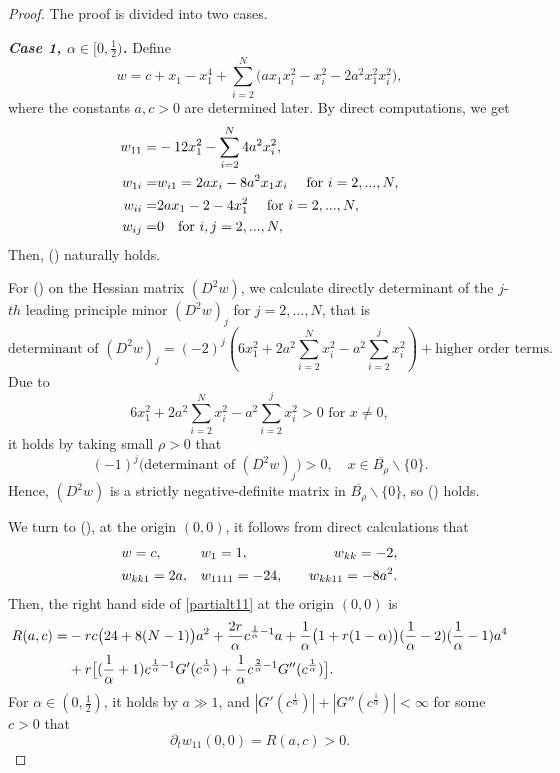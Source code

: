 \documentclass[10pt]{article}         %
\numberwithin{equation}{section}
\begin{document}
\begin{proof}
The proof is divided into two cases. 

\noindent\textbf{\emph{Case 1, $\alpha\in[0,\frac{1}{2})$.}} Define 
\begin{equation}\label{w}w=c+x_1-x_1^4+\sum\limits_{i=2}^{N}(ax_1x_i^2-x_i^2-2a^2x_1^2x_i^2\big),\end{equation}
where the constants $a,c>0$ are determined later. By direct computations, we get 
\begin{align}
 w_{11}=&-12x_1^2-\sum\limits_{i=2}^{N}4a^2x_i^2,\notag\\
 w_{1i}=&w_{i1}=2ax_i-8a^2x_1x_i\quad \text{ for }i=2,...,N,\notag\\
 w_{ii}=&2a x_1-2-4x_1^2\quad \text{ for }i=2,...,N,\notag\\
 w_{ij}=&0\quad \text{for }i,j=2,...,N,\notag
\end{align}
Then, (\expandafter{}) naturally holds.

\vspace{2mm}

For (\expandafter{}) on the Hessian matrix $(D^2w)$, we calculate directly determinant of the $j$-$th$ leading principle minor $(D^2w)_j$ for $j=2,...,N$, that is   
\[\text{determinant of } (D^2w)_j=(-2)^{j}(6x_1^2+2a^2\sum\limits_{i=2}^Nx_i^2-a^2\sum\limits_{i=2}^{j}x_i^2)+\text{higher order terms}.\]
Due to
\[6x_1^2+2a^2\sum\limits_{i=2}^Nx_i^2-a^2\sum\limits_{i=2}^{j}x_i^2>0 \text{ for }x\neq0, \]
it holds by taking small $\rho>0$ that 
\[(-1)^j\big(\text{determinant of } (D^2w)_j\big)>0,\quad x\in \overline{B_{\rho}}\backslash\{0\}.\]
Hence, $(D^2w)$ is a strictly negative-definite matrix in $\overline{B_{\rho}}\backslash\{0\}$, so (\expandafter{}) holds.


\vspace{2mm}

We turn to (\expandafter{}), at the origin $(0,0)$, it follows from direct calculations that  
\begin{align}
&w=c,         &&w_{1}=1,         &&&w_{kk}=-2,\notag\\
&w_{kk1}=2a,  &&w_{1111}=-24,      &&&w_{kk11}=-8a^2.\notag
\end{align}
Then,  the right hand side of \eqref{partialt11} at the origin $(0,0)$ is 
\begin{align}R(a,c)=&-rc\big(24+8(N-1)\big)a^2+\frac{2r}{\alpha}c^{\frac{1}{\alpha}-1}a+\frac{1}{\alpha}\big(1+r(1-\alpha)\big)(\frac{1}{\alpha}-2)(\frac{1}{\alpha}-1)a^4\notag\\
&+r\big[(\frac{1}{\alpha}+1)c^{\frac{1}{\alpha}-1}G'(c^{\frac{1}{\alpha}})+\frac{1}{\alpha}c^{\frac{2}{\alpha}-1}G''(c^{\frac{1}{\alpha}})\big].\notag\end{align}
For $\alpha\in (0,\frac{1}{2})$, it holds by $a\gg1$, and $|G'(c^{\frac{1}{\alpha}})|+|G''(c^{\frac{1}{\alpha}})|<\infty$ for some $c>0$ that 
\begin{equation}\label{012}
\partial_t w_{11}(0,0)=R(a,c)>0.
\end{equation}


\end{proof}
\end{document}
